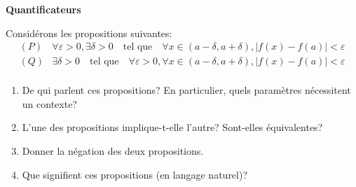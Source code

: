 \documentclass[a4paper,12pt]{article}
\begin{document}
\Exo \textbf{Quantificateurs}

Considérons les propositions suivantes:
\begin{align*}
(P) &  \forall \varepsilon > 0, \exists \delta > 0 \quad \text{tel que} \quad \forall x \in (a-\delta, a+\delta), |f(x) - f(a)| < \varepsilon \\
(Q) &  \exists \delta > 0 \quad \text{tel que} \quad \forall \varepsilon > 0, \forall x \in (a-\delta, a+\delta), |f(x) - f(a)| < \varepsilon \\
\end{align*}

\begin{enumerate}
\item De \og qui\fg{} parlent ces propositions? En particulier, quels paramètres nécessitent un contexte?
\item L'une des propositions implique-t-elle l'autre? Sont-elles équivalentes?
\item Donner la négation des deux propositions.
\item Que signifient ces propositions (en langage naturel)?
\end{enumerate}
\end{document}
